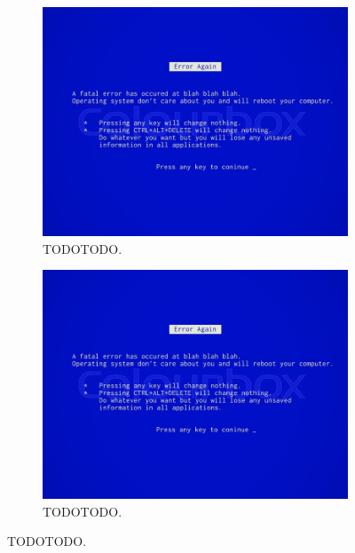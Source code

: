 \begin{figure}[h]
	\begin{subfigure}{0.5\textwidth}
	\includegraphics[width=0.9\linewidth]{./Config/Findings_Database/DR_Template/ProperScreenshot} 
	\caption{TODOTODO.}
	\label{fig:SuperDuperSubfigureLabel1}
	\end{subfigure}
	\begin{subfigure}{0.5\textwidth}
	\includegraphics[width=0.9\linewidth]{./Config/Findings_Database/DR_Template/ProperScreenshot}
	\caption{TODOTODO.}
	\label{fig:SuperDuperSubfigureLabel2}
	\end{subfigure}
	\caption{TODOTODO.}
	\label{fig:SuperDuperFigureLabel}
\end{figure}

 

